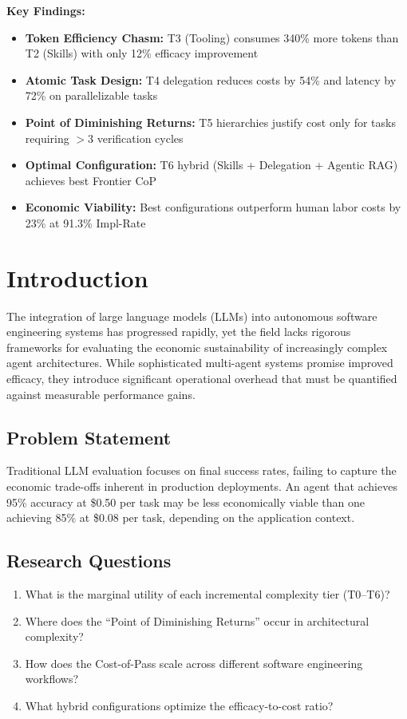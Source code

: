 \documentclass[11pt]{article}
\begin{document}
\textbf{Key Findings:}
\begin{itemize}
    \item \textbf{Token Efficiency Chasm:} T3 (Tooling) consumes 340\% more tokens than T2 (Skills) with only 12\% efficacy improvement
    \item \textbf{Atomic Task Design:} T4 delegation reduces costs by 54\% and latency by 72\% on parallelizable tasks
    \item \textbf{Point of Diminishing Returns:} T5 hierarchies justify cost only for tasks requiring $>$3 verification cycles
    \item \textbf{Optimal Configuration:} T6 hybrid (Skills + Delegation + Agentic RAG) achieves best Frontier CoP
    \item \textbf{Economic Viability:} Best configurations outperform human labor costs by 23\% at 91.3\% Impl-Rate
\end{itemize}

\section{Introduction}

The integration of large language models (LLMs) into autonomous software engineering systems has progressed rapidly, yet the field lacks rigorous frameworks for evaluating the economic sustainability of increasingly complex agent architectures. While sophisticated multi-agent systems promise improved efficacy, they introduce significant operational overhead that must be quantified against measurable performance gains.

\subsection{Problem Statement}
Traditional LLM evaluation focuses on final success rates, failing to capture the economic trade-offs inherent in production deployments. An agent that achieves 95\% accuracy at \$0.50 per task may be less economically viable than one achieving 85\% at \$0.08 per task, depending on the application context.

\subsection{Research Questions}
\begin{enumerate}
    \item What is the marginal utility of each incremental complexity tier (T0--T6)?
    \item Where does the ``Point of Diminishing Returns'' occur in architectural complexity?
    \item How does the Cost-of-Pass scale across different software engineering workflows?
    \item What hybrid configurations optimize the efficacy-to-cost ratio?
\end{enumerate}
\end{document}

